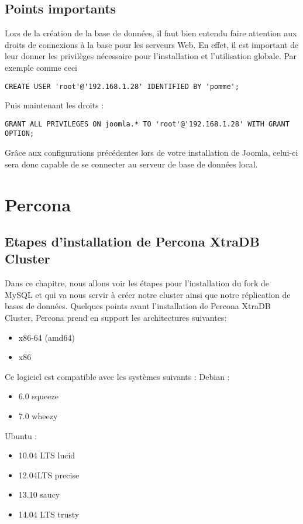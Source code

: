 \documentclass[a4paper,10pt,one side,titlepage]{report}
\begin{document}
\subsection{Points importants}
Lors de la création de la base de données, il faut bien entendu faire attention aux droits de connexions à la base pour les serveurs Web. En effet, il est important de leur donner les privilèges nécessaire pour l'installation et l'utilisation globale.
Par exemple comme ceci 
\begin{lstlisting}[style=code]
CREATE USER 'root'@'192.168.1.28' IDENTIFIED BY 'pomme';
\end{lstlisting}
Puis maintenant les droits : 
\begin{lstlisting}[style=code]
GRANT ALL PRIVILEGES ON joomla.* TO 'root'@'192.168.1.28' WITH GRANT OPTION;
\end{lstlisting}
Grâce aux configurations précédentes lors de votre installation de Joomla, celui-ci sera donc capable de se connecter au serveur de base de données local.


\section{Percona}

\subsection{Etapes d'installation de Percona XtraDB Cluster}
Dans ce chapitre, nous allons voir les étapes pour l'installation du fork de MySQL et qui va nous servir à créer notre cluster ainsi que notre réplication de bases de données.
Quelques points avant l'installation de Percona XtraDB Cluster, Percona prend en support les architectures suivantes:
\begin{itemize}
\item x86-64 (amd64)
\item x86
\end{itemize}
Ce logiciel est compatible avec les systèmes suivants :
Debian :
\begin{itemize}
\item 6.0 squeeze
\item 7.0 wheezy
\end{itemize}
Ubuntu :
\begin{itemize}
\item 10.04 LTS lucid
\item 12.04LTS precise
\item 13.10 saucy
\item 14.04 LTS trusty
\end{itemize}
\end{document}
